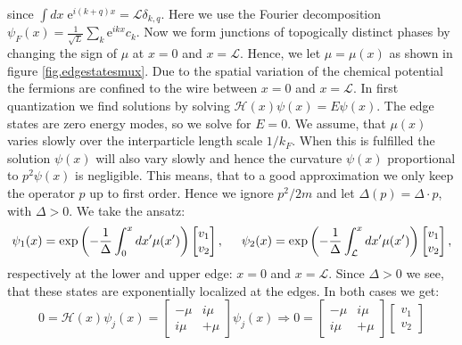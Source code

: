 since $\int dx\; \text{e}^{i(k+q)x} =\mathcal{L} \delta_{k,q} $. Here we use the Fourier decomposition $\psi_{F}(x) = \frac{1}{\sqrt{L}}\sum_k\text{e}^{ikx}c_k$. Now we form junctions of topogically distinct phases by changing the sign of $\mu$ at $x = 0$ and $x = \mathcal{L}$. Hence, we let $\mu = \mu(x)$ as shown in figure \ref{fig.edgestatesmux}. Due to the spatial variation of the chemical potential the fermions are confined to the wire between $x = 0$ and $x = \mathcal{L}$. In first quantization we find solutions by solving $\mathcal{H}(x)\psi(x) = E\psi(x)$. The edge states are zero energy modes, so we solve for $ E = 0$. We assume, that $\mu(x)$ varies slowly over the interparticle length scale $1/k_F$. When this is fulfilled the solution $\psi(x)$ will also vary slowly and hence the curvature $\psi(x)$ proportional to $p^2\psi(x)$ is negligible. This means, that to a good approximation we only keep the operator $p$ up to first order. Hence we ignore $p^2/2m$ and let $\Delta(p) = \Delta \cdot p$, with $\Delta > 0$. We take the ansatz:
\begin{equation}
\psi_1(x) = \exp\left(-\frac{1}{\Delta}\int_{0}^{x} dx' \mu(x')\right)\begin{bmatrix} v_1 \\ v_2 \end{bmatrix}, \hspace{0.5cm} \psi_2(x) = \exp\left(-\frac{1}{\Delta}\int_{\mathcal{L}}^{x} dx' \mu(x')\right)\begin{bmatrix} v_1 \\ v_2 \end{bmatrix}, \nonumber
\end{equation}  
respectively at the lower and upper edge: $x = 0$ and $x = \mathcal{L}$. Since $\Delta > 0$ we see, that these states are exponentially localized at the edges. In both cases we get:
\begin{equation}
0 = \mathcal{H}(x)\psi_j(x) = \begin{bmatrix} - \mu  & i\mu \\ i\mu & + \mu \end{bmatrix}\psi_j(x) \Rightarrow 0 = \begin{bmatrix} - \mu  & i\mu \\ i\mu & + \mu \end{bmatrix}\begin{bmatrix} v_1 \\ v_2 \end{bmatrix} \nonumber
\end{equation}

